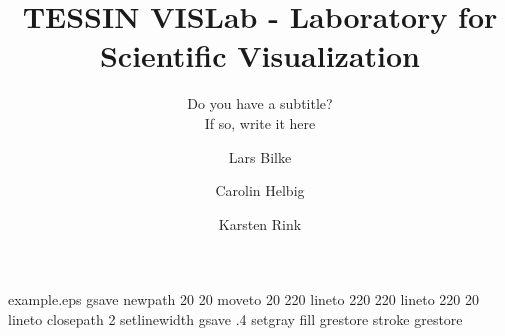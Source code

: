 %
%
%
%
%
\begin{filecontents*}{example.eps}
gsave
newpath
  20 20 moveto
  20 220 lineto
  220 220 lineto
  220 20 lineto
closepath
2 setlinewidth
gsave
  .4 setgray fill
grestore
stroke
grestore
\end{filecontents*}
%
\RequirePackage{fix-cm}
%
\documentclass[twocolumn]{svjour3}          %
%
\smartqed  %
%
\usepackage{graphicx}
%
%
%
%
%


\title{TESSIN VISLab - Laboratory for Scientific Visualization%
}
\subtitle{Do you have a subtitle?\\ If so, write it here}


\author{Lars Bilke         \and
        Carolin Helbig     \and
        Karsten Rink
}



